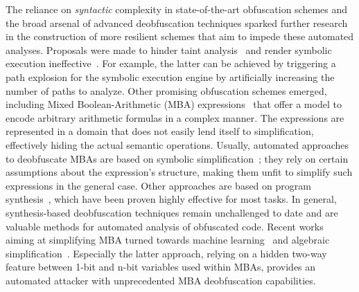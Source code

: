 \documentclass[letterpaper,twocolumn,10pt]{article}
\theoremstyle{customexample}
\theoremstyle{customexperiment}
\begin{document}
The reliance on \emph{syntactic} complexity in state-of-the-art obfuscation schemes and the broad arsenal of advanced deobfuscation techniques sparked further research in the construction of more resilient schemes that aim to impede these automated analyses.
Proposals were made to hinder taint analysis~\cite{cavallaro2007anti,sarwar2013effectiveness} and render symbolic execution ineffective~\cite{zhou2007information, banescu2016code, xu2018manufacturing, ollivier2019howto}. For example, the latter can be achieved by triggering a path explosion for the symbolic execution engine by artificially increasing the number of paths to analyze.
Other promising obfuscation schemes emerged, including Mixed Boolean-Arithmetic (MBA) expressions~\cite{zhou2007information,eyrolles2017dissertation,banescu2017predicting} that offer a model to encode arbitrary arithmetic formulas in a complex manner. The expressions are represented in a domain that does not easily lend itself to simplification, effectively hiding the actual semantic operations. Usually, automated approaches to deobfuscate MBAs are based on symbolic simplification~\cite{guinet2016arybo,barhelemy2016binary,eyrolles2016defeating,eyrolles2017dissertation}; they rely on certain assumptions about the expression's structure, making them unfit to simplify such expressions in the general case. Other approaches are based on program synthesis~\cite{blazytko2017syntia,david2020qsynth, menguy2021xyntia}, which have been proven highly effective for most tasks. In general, synthesis-based deobfuscation techniques remain unchallenged to date and are valuable methods for automated analysis of obfuscated code. Recent works aiming at simplifying MBA turned towards machine learning~\cite{feng2020neureduce} and algebraic simplification~\cite{liu2021mbablast}. Especially the latter approach, relying on a hidden two-way feature between 1-bit and n-bit variables used within MBAs, provides an automated attacker with unprecedented MBA deobfuscation capabilities.
\end{document}
